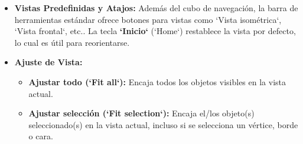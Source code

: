 \documentclass[12pt]{article}
\begin{document}
\begin{itemize}[label=\textbullet]
    \item \textbf{Vistas Predefinidas y Atajos:} Además del cubo de navegación, la barra de herramientas estándar ofrece botones para vistas como `Vista isométrica`, `Vista frontal`, etc.. La tecla \textbf{`Inicio`} (`Home`) restablece la vista por defecto, lo cual es útil para reorientarse.
    \item \textbf{Ajuste de Vista:}
    \begin{itemize}[label=\textendash]
        \item \textbf{Ajustar todo (`Fit all`):} Encaja todos los objetos visibles en la vista actual.
        \item \textbf{Ajustar selección (`Fit selection`):} Encaja el/los objeto(s) seleccionado(s) en la vista actual, incluso si se selecciona un vértice, borde o cara.
    \end{itemize}
\end{itemize}

\end{document}
